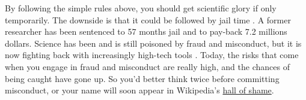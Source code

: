 \documentclass[11pt,letter]{article}
\providecommand\citep{\cite}
\begin{document}
By following the simple rules above, you should get scientific glory if only temporarily. The downside is that it could be followed by jail time \citep{grant:2015}. A former researcher has been sentenced to
57 months jail and to pay-back 7.2 millions dollars. Science has been and is
still poisoned by fraud and misconduct, but it is now fighting back with increasingly high-tech tools \citep{buranyi:2017}. Today, the risks that come when you engage in
fraud and misconduct are really high, and the chances of being
caught have gone up. So you'd better think twice before committing misconduct, or
your name will soon appear in Wikipedia's
\href{https://en.wikipedia.org/wiki/Scientific_misconduct#Notable_individual_cases}{hall of shame}.



\end{document}
